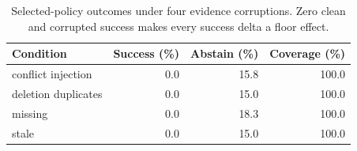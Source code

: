 \begin{table}[t]
\caption{Selected-policy outcomes under four evidence corruptions. Zero clean and corrupted success makes every success delta a floor effect.}
\label{tab:robustness}
\centering
\scriptsize
\begin{tabular}{@{}lrrr@{}}
\toprule
Condition & Success (\%) & Abstain (\%) & Coverage (\%) \\
\midrule
conflict injection & 0.0 & 15.8 & 100.0 \\
deletion duplicates & 0.0 & 15.0 & 100.0 \\
missing & 0.0 & 18.3 & 100.0 \\
stale & 0.0 & 15.0 & 100.0 \\
\bottomrule
\end{tabular}
\end{table}
